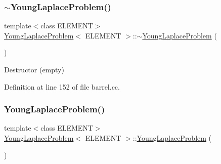 \mbox{\label{classYoungLaplaceProblem_aa3482606bfd86a3db9d2dec86ba75f14}} 
\subsubsection{\texorpdfstring{$\sim$\+Young\+Laplace\+Problem()}{~YoungLaplaceProblem()}\hspace{0.1cm}{\footnotesize\ttfamily [1/2]}}
{\footnotesize\ttfamily template$<$class E\+L\+E\+M\+E\+NT$>$ \\
\hyperlink{classYoungLaplaceProblem}{Young\+Laplace\+Problem}$<$ E\+L\+E\+M\+E\+NT $>$\+::$\sim$\hyperlink{classYoungLaplaceProblem}{Young\+Laplace\+Problem} (\begin{DoxyParamCaption}{ }\end{DoxyParamCaption})\hspace{0.3cm}{\ttfamily [inline]}}



Destructor (empty) 



Definition at line 152 of file barrel.\+cc.

\mbox{\label{classYoungLaplaceProblem_a4ea552f351994849e9ab597ef2da797a}} 
\subsubsection{\texorpdfstring{Young\+Laplace\+Problem()}{YoungLaplaceProblem()}\hspace{0.1cm}{\footnotesize\ttfamily [2/2]}}
{\footnotesize\ttfamily template$<$class E\+L\+E\+M\+E\+NT$>$ \\
\hyperlink{classYoungLaplaceProblem}{Young\+Laplace\+Problem}$<$ E\+L\+E\+M\+E\+NT $>$\+::\hyperlink{classYoungLaplaceProblem}{Young\+Laplace\+Problem} (\begin{DoxyParamCaption}{ }\end{DoxyParamCaption})}



